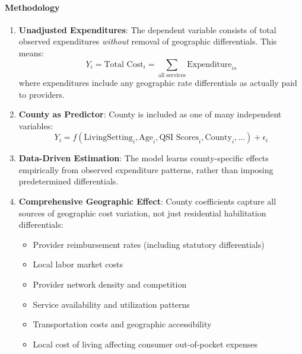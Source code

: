 \paragraph{Methodology}
\begin{enumerate}
    \item \textbf{Unadjusted Expenditures}: The dependent variable consists of total observed expenditures \textit{without} removal of geographic differentials. This means:
    \begin{equation}
    Y_i = \text{Total Cost}_i = \sum_{\text{all services}} \text{Expenditure}_{is}
    \label{eq:current-dependent}
    \end{equation}
    where expenditures include any geographic rate differentials as actually paid to providers.
    
    \item \textbf{County as Predictor}: County is included as one of many independent variables:
    \begin{equation}
    Y_i = f(\text{LivingSetting}_i, \text{Age}_i, \text{QSI Scores}_i, \text{County}_i, \ldots) + \epsilon_i
    \label{eq:current-model}
    \end{equation}
    
    \item \textbf{Data-Driven Estimation}: The model learns county-specific effects empirically from observed expenditure patterns, rather than imposing predetermined differentials.
    
    \item \textbf{Comprehensive Geographic Effect}: County coefficients capture all sources of geographic cost variation, not just residential habilitation differentials:
    \begin{itemize}
        \item Provider reimbursement rates (including statutory differentials)
        \item Local labor market costs
        \item Provider network density and competition
        \item Service availability and utilization patterns
        \item Transportation costs and geographic accessibility
        \item Local cost of living affecting consumer out-of-pocket expenses
    \end{itemize}
\end{enumerate}

